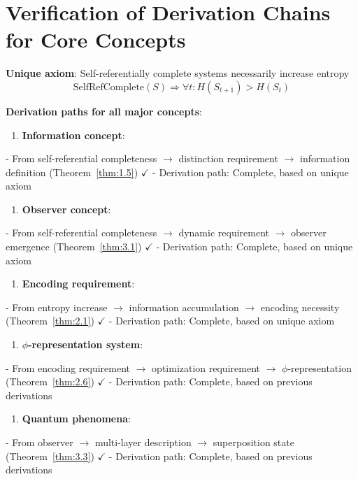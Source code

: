 
\section{Verification of Derivation Chains for Core Concepts}
\label{sec:ch08_completeness:verification-of-derivation-chains-for-core-concepts}

\textbf{Unique axiom}: Self-referentially complete systems necessarily increase entropy
\begin{equation}
\text{SelfRefComplete}(S) \Rightarrow \forall t: H(S_{t+1}) > H(S_t)
\end{equation}

\textbf{Derivation paths for all major concepts}:

\begin{enumerate}
\item \textbf{Information concept}:
\end{enumerate}
   - From self-referential completeness $\rightarrow$ distinction requirement $\rightarrow$ information definition (Theorem~\ref{thm:1.5}) $\checkmark$
   - Derivation path: Complete, based on unique axiom

\begin{enumerate}
\item \textbf{Observer concept}:
\end{enumerate}
   - From self-referential completeness $\rightarrow$ dynamic requirement $\rightarrow$ observer emergence (Theorem~\ref{thm:3.1}) $\checkmark$
   - Derivation path: Complete, based on unique axiom

\begin{enumerate}
\item \textbf{Encoding requirement}:
\end{enumerate}
   - From entropy increase $\rightarrow$ information accumulation $\rightarrow$ encoding necessity (Theorem~\ref{thm:2.1}) $\checkmark$
   - Derivation path: Complete, based on unique axiom

\begin{enumerate}
\item \textbf{$\phi$-representation system}:
\end{enumerate}
   - From encoding requirement $\rightarrow$ optimization requirement $\rightarrow$ $\phi$-representation (Theorem~\ref{thm:2.6}) $\checkmark$
   - Derivation path: Complete, based on previous derivations

\begin{enumerate}
\item \textbf{Quantum phenomena}:
\end{enumerate}
   - From observer $\rightarrow$ multi-layer description $\rightarrow$ superposition state (Theorem~\ref{thm:3.3}) $\checkmark$
   - Derivation path: Complete, based on previous derivations

